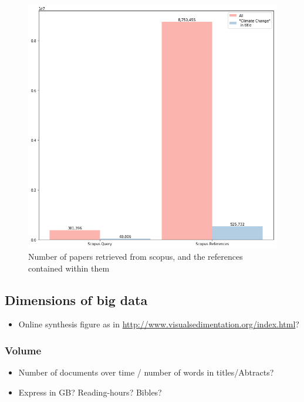 \documentclass{article}
\begin{document}
\begin{figure}
\includegraphics[width=\linewidth]{plots/scopus_docs_refs}
\caption{Number of papers retrieved from scopus, and the references contained within them}
\end{figure}


% 
% 

\subsection{Dimensions of big data}
\begin{itemize}		
    \item Online synthesis figure as in \url{http://www.visualsedimentation.org/index.html}?
    
\end{itemize}

\subsubsection*{Volume}
\begin{itemize}
	\item Number of documents over time / number of words in titles/Abtracts?
    \item Express in GB? Reading-hours? Bibles? 
\end{itemize}
\end{document}
